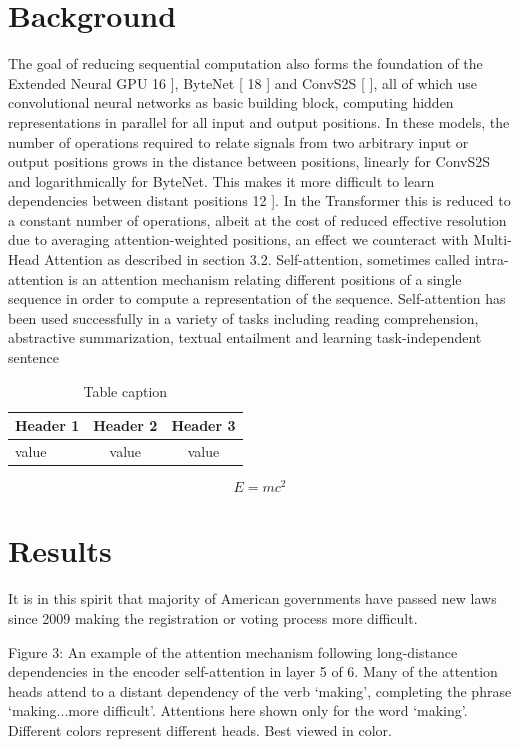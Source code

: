 \documentclass[12pt, a4paper]{article}
\begin{document}
\section{Background}
The goal of reducing sequential computation also forms the foundation of the Extended Neural GPU 16 ], ByteNet [ 18 ] and ConvS2S [ ], all of which use convolutional neural networks as basic building block, computing hidden representations in parallel for all input and output positions. In these models, the number of operations required to relate signals from two arbitrary input or output positions grows in the distance between positions, linearly for ConvS2S and logarithmically for ByteNet. This makes it more difficult to learn dependencies between distant positions 12 ]. In the Transformer this is reduced to a constant number of operations, albeit at the cost of reduced effective resolution due to averaging attention-weighted positions, an effect we counteract with Multi-Head Attention as described in section 3.2. Self-attention, sometimes called intra-attention is an attention mechanism relating different positions of a single sequence in order to compute a representation of the sequence. Self-attention has been used successfully in a variety of tasks including reading comprehension, abstractive summarization, textual entailment and learning task-independent sentence

\begin{table}[H]
\centering
\caption{Table caption}
\begin{tabular}{lcc}
\toprule
Header 1 & Header 2 & Header 3 \\
\midrule
value & value & value \\
\bottomrule
\end{tabular}
\end{table}

\begin{equation}
E = mc^2
\label{eq:einstein}
\end{equation}

\section{Results}
It is in this spirit that majority of American governments have passed new laws since 2009 making the registration or voting process more difficult. 

Figure 3: An example of the attention mechanism following long-distance dependencies in the encoder self-attention in layer 5 of 6. Many of the attention heads attend to a distant dependency of the verb ‘making’, completing the phrase ‘making...more difficult’. Attentions here shown only for the word ‘making’. Different colors represent different heads. Best viewed in color.
\end{document}
